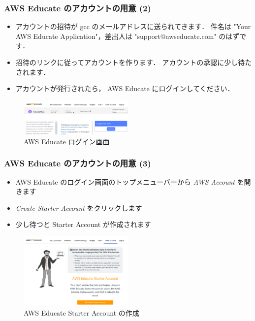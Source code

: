\documentclass[unicode,11pt]{beamer}
\begin{document}
\begin{frame}
\frametitle{AWS Educate のアカウントの用意 (2)}
\begin{itemize}
    \item アカウントの招待が gcc のメールアドレスに送られてきます．
    件名は "Your AWS Educate Application"，差出人は "support@awseducate.com" のはずです．
    \item 招待のリンクに従ってアカウントを作ります．
    アカウントの承認に少し待たされます．
    \item アカウントが発行されたら， AWS Educate にログインしてください．
\end{itemize}

\begin{figure}
    \centering
    \includegraphics[width=0.5\textwidth]{imgs/aws_educate_screenshot1.png}
    \caption{AWS Educate ログイン画面}
\end{figure}

\end{frame}

\begin{frame}
\frametitle{AWS Educate のアカウントの用意 (3)}

\begin{itemize}
    \item AWS Educate のログイン画面のトップメニューバーから \emph{AWS Account} を開きます
    \item \emph{Create Starter Account} をクリックします
    \item 少し待つと Starter Account が作成されます
\end{itemize}

\begin{figure}
    \centering
    \includegraphics[width=0.5\textwidth]{imgs/aws_educate_screenshot2.png}
    \caption{AWS Educate Starter Account の作成}
\end{figure}

\end{frame}
\end{document}
